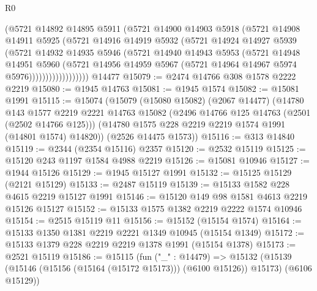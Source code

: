 \begin{lexlean}{R0}
\begin{coremodule}
                    (@5721
                      @14892
                      @14895
                      @5911
                      (@5721
                        @14900
                        @14903
                        @5918
                        (@5721
                          @14908
                          @14911
                          @5925
                          (@5721
                            @14916
                            @14919
                            @5932
                            (@5721
                              @14924
                              @14927
                              @5939
                              (@5721
                                @14932
                                @14935
                                @5946
                                (@5721
                                  @14940
                                  @14943
                                  @5953
                                  (@5721
                                    @14948
                                    @14951
                                    @5960
                                    (@5721
                                      @14956
                                      @14959
                                      @5967
                                      (@5721 @14964 @14967 @5974 @5976))))))))))))))))))
    @14477
@15079 := @2474 @14766 @308 @1578 @2222 @2219
@15080 := @1945 @14763
@15081 := @1945 @1574
@15082 := @15081 @1991
@15115 := @15074
    (@15079
      (@15080 @15082)
      (@2067 @14477)
      (@14780
        @143
        @1577
        @2219
        @2221
        @14763
        @15082
        (@2496 @14766 @125 @14763 (@2501 (@2502 @14766 @125)))
        (@14780 @1575 @228 @2219 @2219 @1574 @1991 (@14801 @1574) @14820))
      (@2526 @14475 @1573))
@15116 := @313 @14840
@15119 := @2344 (@2354 @15116) @2357
@15120 := @2532 @15119
@15125 := @15120 @243 @1197 @1584 @4988 @2219
@15126 := @15081 @10946
@15127 := @1944 @15126
@15129 := @1945 @15127 @1991
@15132 := @15125 @15129 (@2121 @15129)
@15133 := @2487 @15119
@15139 := @15133 @1582 @228 @4615 @2219 @15127 @1991
@15146 := @15120 @149 @98 @1581 @4613 @2219 @15126 @15127
@15152 := @15133 @1575 @1382 @2219 @2222 @1574 @10946
@15154 := @2515 @15119 @11
@15156 := @15152 (@15154 @1574)
@15164 := @15133 @1350 @1381 @2219 @2221 @1349 @10945 (@15154 @1349)
@15172 := @15133 @1379 @228 @2219 @2219 @1378 @1991 (@15154 @1378)
@15173 := @2521 @15119
@15186 := @15115
    (fun ("_" : @14479) =>
    @15132 (@15139 (@15146 (@15156 (@15164 (@15172 @15173))) (@6100 @15126)) @15173) (@6106 @15129))

\end{coremodule}
\end{lexlean}
